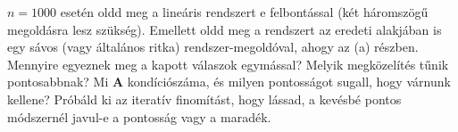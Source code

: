 \documentclass[
  magyar,
  11pt]{article}
\providecommand{\boldsymbol}[1]{\mathbf{#1}}
\begin{document}
\(n = 1000\) esetén oldd meg a lineáris rendszert e felbontással (két
háromszögű megoldásra lesz szükség). Emellett oldd meg a rendszert az
eredeti alakjában is egy sávos (vagy általános ritka)
rendszer-megoldóval, ahogy az (a) részben. Mennyire egyeznek meg a
kapott válaszok egymással? Melyik megközelítés tűnik pontosabbnak? Mi
\(\boldsymbol{A}\) kondíciószáma, és milyen pontosságot sugall, hogy
várnunk kellene? Próbáld ki az iteratív finomítást, hogy lássad, a
kevésbé pontos módszernél javul-e a pontosság vagy a maradék.
\end{document}
